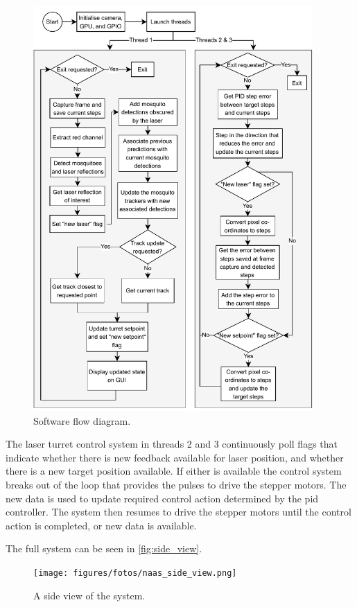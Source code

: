 \begin{figure}[!htb]
  \centering
  \includegraphics[width=0.95\textwidth]{figures/software_flow_diagram.pdf}
  \caption{Software flow diagram.}
  \label{fig:software_flow_diagram}
\end{figure}

The laser turret control system in threads 2 and 3 continuously poll flags that indicate whether there is new feedback available for laser position, and whether there is a new target position available. If either is available the control system breaks out of the loop that provides the pulses to drive the stepper motors. The new data is used to update required control action determined by the \gls{pid} controller. The system then resumes to drive the stepper motors until the control action is completed, or new data is available.

The full system can be seen in \autoref{fig:side_view}.
\begin{figure}
  \centering
  \texttt{[image: figures/fotos/naas\_side\_view.png]}
  \caption{A side view of the system.}
  \label{fig:side_view}
\end{figure}

